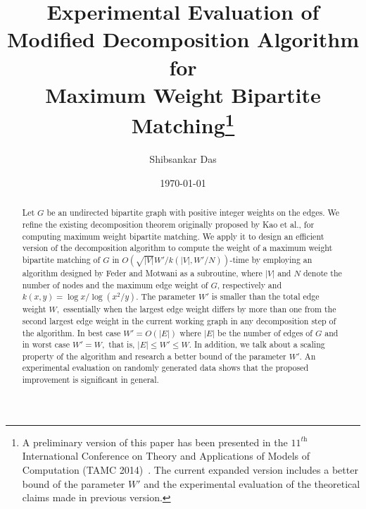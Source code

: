 \documentclass[runningheads,a4paper]{llncs}
\begin{document}
\mainmatter

\title{Experimental Evaluation of\\Modified Decomposition Algorithm for\\Maximum Weight Bipartite Matching\thanks{A preliminary version of this paper has been presented in the $11^{\textit{th}}$ International Conference on Theory and Applications of Models of Computation (TAMC 2014)~\cite{das14}. The current expanded version includes a better bound of the parameter $W'$ and the experimental evaluation of the theoretical claims made in previous version.}}




\author{Shibsankar Das}


\date{\today}


\maketitle              

\begin{abstract}
Let $G$ be an undirected bipartite graph with 
positive integer weights
on the edges. We refine the existing decomposition
theorem originally proposed by Kao et al., for computing
maximum weight bipartite matching. We apply it to design an efficient version of the decomposition algorithm to compute the weight of
a maximum weight bipartite matching of $G$ in $O(\sqrt{|V|}W'/k(|V|,W'/N))$-time
by employing an algorithm designed by Feder and Motwani as a subroutine, 
where $|V|$ and $N$  denote the number of nodes and
the maximum edge weight of $G$, respectively and $k(x,y)=\log x /\log(x^2/y)$.
The parameter $W'$ is smaller than the total edge weight $W,$ 
essentially when the largest edge weight differs by more than one from the second largest edge weight in the current working graph in any decomposition step of the algorithm. In best case $W'=O(|E|)$ where $|E|$ be the number of edges of $G$ and 
in worst case $W'=W,$ that is, $|E| \leq W' \leq W.$
In addition, we talk about a scaling property of the algorithm and research a better bound of the parameter $W'$. 
An experimental evaluation on randomly generated data shows that the proposed improvement is significant in general.

\end{abstract}
\end{document}
